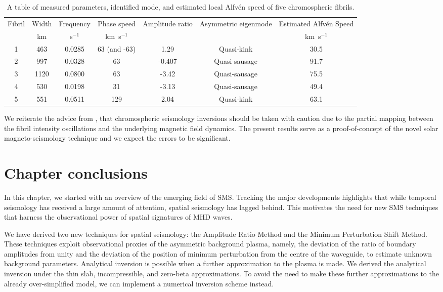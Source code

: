 \documentclass[12pt]{../style-files/ociamthesis}
\begin{document}
\begin{sidewaystable}
	\centering
	\caption{A table of measured parameters, identified mode, and estimated local Alfv\'{e}n speed of five chromospheric fibrils.}
	\begin{tabular}{ccccccc}
		\toprule
		Fibril & Width & Frequency & Phase speed & Amplitude ratio & Asymmetric eigenmode & Estimated Alfv\'{e}n Speed \\
		& km & s$^{-1}$ & km~s$^{-1}$ & & & km~s$^{-1}$ \\
		\midrule
		1 & 463 & 0.0285 & 63 (and -63) & 1.29 & Quasi-kink & 30.5 \\
		2 & 997 & 0.0328 & 63 & -0.407 & Quasi-sausage & 91.7 \\
		3 & 1120 & 0.0800 & 63 & -3.42 & Quasi-sausage & 75.5 \\
		4 & 530 & 0.0198 & 31 & -3.13 & Quasi-sausage & 49.4 \\
		5 & 551 & 0.0511 & 129 & 2.04 & Quasi-kink & 63.1 \\
		\bottomrule
	\end{tabular} \label{table: fibril inversion}
\end{sidewaystable}

We reiterate the advice from \cite{lee_etal15}, that chromospheric seismology inversions should be taken with caution due to the partial mapping between the fibril intensity oscillations and the underlying magnetic field dynamics. The present results serve as a proof-of-concept of the novel solar magneto-seismology technique and we expect the errors to be significant.


\section{Chapter conclusions}
\label{sec: chpt 4 conc}

In this chapter, we started with an overview of the emerging field of SMS. Tracking the major developments highlights that while temporal seismology has received a large amount of attention, spatial seismology has lagged behind. This motivates the need for new SMS techniques that harness the observational power of spatial signatures of MHD waves.

We have derived two new techniques for spatial seismology: the Amplitude Ratio Method and the Minimum Perturbation Shift Method. These techniques exploit observational proxies of the asymmetric background plasma, namely, the deviation of the ratio of boundary amplitudes from unity and the deviation of the position of minimum perturbation from the centre of the waveguide, to estimate unknown background parameters. Analytical inversion is possible when a further approximation to the plasma is made. We derived the analytical inversion under the thin slab, incompressible, and zero-beta approximations. To avoid the need to make these further approximations to the already over-simplified model, we can implement a numerical inversion scheme instead. 
\end{document}
